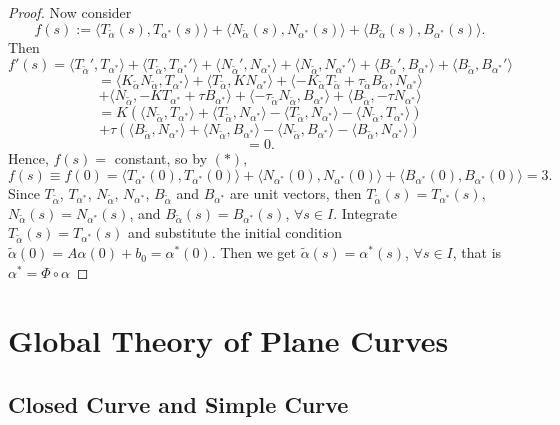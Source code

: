\begin{proof}
\noindent Now consider
\[
f(s) := \langle T_{\tilde{\alpha}}(s), T_{\alpha^*}(s)\rangle + \langle N_{\tilde{\alpha}}(s), N_{\alpha^*}(s)\rangle + \langle B_{\tilde{\alpha}}(s), B_{\alpha^*}(s)\rangle.
\]
Then
\[
f'(s) = \langle T_{\tilde{\alpha}}', T_{\alpha^*}\rangle + \langle T_{\tilde{\alpha}}, T_{\alpha^*}'\rangle + \langle N_{\tilde{\alpha}}', N_{\alpha^*}\rangle + \langle N_{\tilde{\alpha}}, N_{\alpha^*}'\rangle + \langle B_{\tilde{\alpha}}', B_{\alpha^*}\rangle + \langle B_{\tilde{\alpha}}, B_{\alpha^*}'\rangle
\]
\[
= \langle K_{\tilde{\alpha}}N_{\tilde{\alpha}}, T_{\alpha^*}\rangle + \langle T_{\tilde{\alpha}}, KN_{\alpha^*}\rangle + \langle -K_{\tilde{\alpha}}T_{\tilde{\alpha}} + \tau_{\tilde{\alpha}}B_{\tilde{\alpha}}, N_{\alpha^*}\rangle
\]
\[
+ \langle N_{\tilde{\alpha}}, -KT_{\alpha^*} + \tau B_{\alpha^*}\rangle + \langle -\tau_{\tilde{\alpha}}N_{\tilde{\alpha}}, B_{\alpha^*}\rangle + \langle B_{\tilde{\alpha}}, -\tau N_{\alpha^*}\rangle
\]
\[
= K\left(\langle N_{\tilde{\alpha}}, T_{\alpha^*}\rangle + \langle T_{\tilde{\alpha}}, N_{\alpha^*}\rangle - \langle T_{\tilde{\alpha}}, N_{\alpha^*}\rangle - \langle N_{\tilde{\alpha}}, T_{\alpha^*}\rangle\right)
\]
\[
+ \tau\left(\langle B_{\tilde{\alpha}}, N_{\alpha^*}\rangle + \langle N_{\tilde{\alpha}}, B_{\alpha^*}\rangle - \langle N_{\tilde{\alpha}}, B_{\alpha^*}\rangle - \langle B_{\tilde{\alpha}}, N_{\alpha^*}\rangle\right)
\]
\[
= 0.
\]
Hence, $f(s) = $ constant, so by $(*)$,
\[
f(s)\equiv f(0) = \langle T_{\alpha^*}(0), T_{\alpha^*}(0)\rangle + \langle N_{\alpha^*}(0), N_{\alpha^*}(0)\rangle + \langle B_{\alpha^*}(0), B_{\alpha^*}(0)\rangle = 3.
\]
Since $T_{\tilde{\alpha}}$, $T_{\alpha^*}$, $N_{\tilde{\alpha}}$, $N_{\alpha^*}$, $B_{\tilde{\alpha}}$ and $B_{\alpha^*}$ are unit vectors, then $T_{\tilde{\alpha}}(s) = T_{\alpha^*}(s)$, $N_{\tilde{\alpha}}(s) = N_{\alpha^*}(s)$, and $B_{\tilde{\alpha}}(s) = B_{\alpha^*}(s)$, $\forall s\in I$. Integrate $T_{\tilde{\alpha}}(s) = T_{\alpha^*}(s)$ and substitute the initial condition $\tilde{\alpha}(0) = A\alpha(0) + b_0 = \alpha^*(0)$. Then we get $\tilde{\alpha}(s) = \alpha^*(s)$, $\forall s\in I$, that is
$
\alpha^* = \Phi\circ\alpha
$
\end{proof}

\section{Global Theory of Plane Curves}

\subsection{Closed Curve and Simple Curve}

